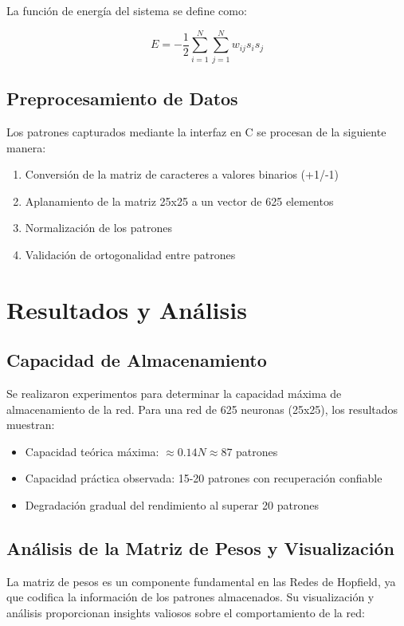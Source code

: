 \documentclass{article}
\begin{document}
La función de energía del sistema se define como:

\[ E = -\frac{1}{2} \sum_{i=1}^{N} \sum_{j=1}^{N} w_{ij} s_i s_j \]

\subsection{Preprocesamiento de Datos}
Los patrones capturados mediante la interfaz en C se procesan de la siguiente manera:
\begin{enumerate}
    \item Conversión de la matriz de caracteres a valores binarios (+1/-1)
    \item Aplanamiento de la matriz 25x25 a un vector de 625 elementos
    \item Normalización de los patrones
    \item Validación de ortogonalidad entre patrones
\end{enumerate}

\section{Resultados y Análisis}
\subsection{Capacidad de Almacenamiento}
Se realizaron experimentos para determinar la capacidad máxima de almacenamiento de la red. Para una red de 625 neuronas (25x25), los resultados muestran:

\begin{itemize}
    \item Capacidad teórica máxima: \(\approx 0.14N \approx 87\) patrones
    \item Capacidad práctica observada: 15-20 patrones con recuperación confiable
    \item Degradación gradual del rendimiento al superar 20 patrones
\end{itemize}

\subsection{Análisis de la Matriz de Pesos y Visualización}
La matriz de pesos es un componente fundamental en las Redes de Hopfield, ya que codifica la información de los patrones almacenados. Su visualización y análisis proporcionan insights valiosos sobre el comportamiento de la red:
\end{document}
